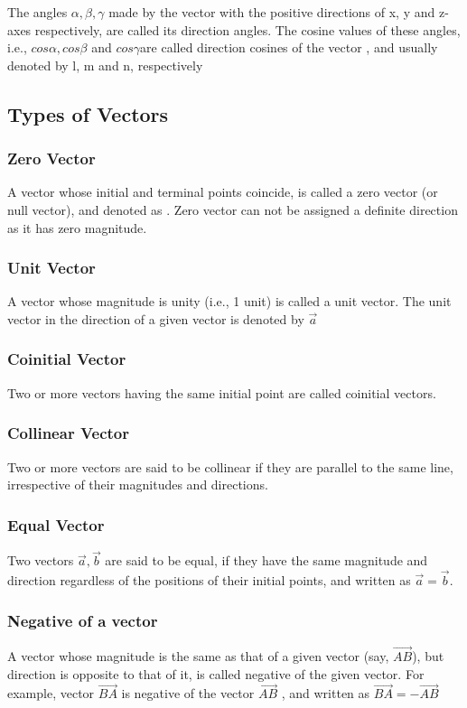 \documentclass[12pt]{article}
\begin{document}
\begin{multicols*}{2}
The angles $\alpha,\beta,\gamma$ made by the vector with the positive directions of x, y and z-axes respectively,
are called its direction angles. The cosine values of these angles, i.e., $cos \alpha, cos \beta$ and
$cos \gamma$are called direction cosines of the vector , and usually denoted by l, m and n,
respectively

\subsection*{Types of Vectors}
\subsubsection*{Zero Vector}
A vector whose initial and terminal points coincide, is called a zero vector
(or null vector), and denoted as . Zero vector can not be assigned a definite direction
as it has zero magnitude.
\subsubsection*{Unit Vector}
A vector whose magnitude is unity (i.e., 1 unit) is called a unit vector. The
unit vector in the direction of a given vector is denoted by $\vec{a}$

\subsubsection*{Coinitial Vector}
Two or more vectors having the same initial point are called coinitial
vectors.
\subsubsection*{Collinear Vector}
Two or more vectors are said to be collinear if they are parallel to
the same line, irrespective of their magnitudes and directions.
\subsubsection*{Equal Vector}
Two vectors  $\vec{a},\vec{b}$ are said to be equal, if they have the same
magnitude and direction regardless of the positions of their initial points, and written
as $\vec{a}=\vec{b}$.
\subsubsection*{Negative of a vector }
A vector whose magnitude is the same as that of a given vector
(say, $\vec{AB}$), but direction is opposite to that of it, is called negative of the given vector.
For example, vector $\vec{BA}$ is negative of the vector $\vec{AB}$ , and written as $\vec{BA}=-\vec{AB}$





\end{multicols*}
\end{document}
